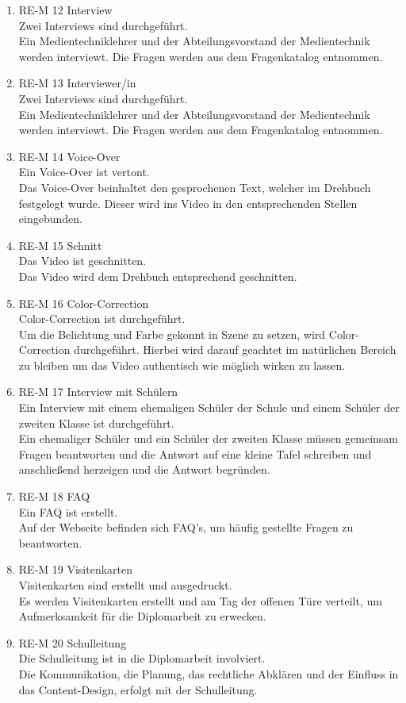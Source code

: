 \begin{enumerate}
\item RE-M 12 Interview\\
Zwei Interviews sind durchgeführt.\\
Ein Medientechniklehrer und der Abteilungsvorstand der Medientechnik werden interviewt. Die Fragen werden aus dem Fragenkatalog entnommen.
\item RE-M 13 Interviewer/in\\
Zwei Interviews sind durchgeführt.\\
Ein Medientechniklehrer und der Abteilungsvorstand der Medientechnik werden interviewt. Die Fragen werden aus dem Fragenkatalog entnommen.
\item RE-M 14 Voice-Over\\
Ein Voice-Over ist vertont.\\
Das Voice-Over beinhaltet den gesprochenen Text, welcher im Drehbuch festgelegt wurde. Dieser wird ins Video in den entsprechenden Stellen eingebunden.
\item RE-M 15 Schnitt \\
Das Video ist geschnitten.\\
Das Video wird dem Drehbuch entsprechend geschnitten.
\item RE-M 16 Color-Correction\\
Color-Correction ist durchgeführt.\\
Um die Belichtung und Farbe gekonnt in Szene zu setzen, wird Color-Correction durchgeführt. Hierbei wird darauf geachtet im natürlichen Bereich zu bleiben um das Video authentisch wie möglich wirken zu lassen.
\item RE-M 17 Interview mit Schülern\\
Ein Interview mit einem ehemaligen Schüler der Schule und einem Schüler der zweiten Klasse ist durchgeführt. \\
Ein ehemaliger Schüler und ein Schüler der zweiten Klasse müssen gemeinsam Fragen beantworten und die Antwort auf eine kleine Tafel schreiben und anschließend herzeigen und die Antwort begründen.
\item RE-M 18 FAQ\\
Ein FAQ ist erstellt.\\
Auf der Webseite befinden sich FAQ’s, um häufig gestellte Fragen zu beantworten.
\item RE-M 19 Visitenkarten\\
Visitenkarten sind erstellt und ausgedruckt.\\
Es werden Visitenkarten erstellt und am Tag der offenen Türe verteilt, um Aufmerksamkeit für die Diplomarbeit zu erwecken.
\item RE-M 20 Schulleitung \\
Die Schulleitung ist in die Diplomarbeit involviert.\\
Die Kommunikation, die Planung, das rechtliche Abklären und der Einfluss in das Content-Design, erfolgt mit der Schulleitung. 
\end{enumerate}

